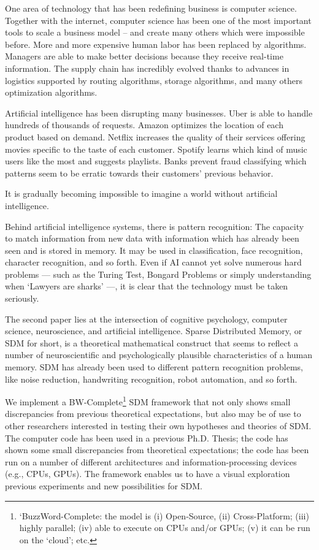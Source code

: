 One area of technology that has been redefining business is computer science. Together with the internet, computer science has been one of the most important tools to scale a business model -- and create many others which were impossible before. More and more expensive human labor has been replaced by algorithms. Managers are able to make better decisions because they receive real-time information. The supply chain has incredibly evolved thanks to advances in logistics supported by routing algorithms, storage algorithms, and many others optimization algorithms.

Artificial intelligence has been disrupting many businesses. Uber is able to handle hundreds of thousands of requests. Amazon optimizes the location of each product based on demand. Netflix increases the quality of their services offering movies specific to the taste of each customer. Spotify learns which kind of music users like the most and suggests playlists. Banks prevent fraud classifying which patterns seem to be erratic towards their customers' previous behavior.

It is gradually becoming impossible to imagine a world without artificial intelligence.

Behind artificial intelligence systems, there is pattern recognition: The capacity to match information from new data with information which has already been seen and is stored in memory. It may be used in classification, face recognition, character recognition, and so forth.  Even if AI cannot yet solve numerous hard problems --- such as the Turing Test, Bongard Problems or simply understanding when `Lawyers are sharks' \citep{french1990subcognition, french2000turing, linhares2000glimpse, french2001co} ---, it is clear that the technology must be taken seriously.

The second paper lies at the intersection of cognitive psychology, computer science, neuroscience, and artificial intelligence.  Sparse Distributed Memory, or SDM for short, is a theoretical mathematical construct that seems to reflect a number of neuroscientific and psychologically plausible characteristics of a human memory. SDM has already been used to different pattern recognition problems, like noise reduction, handwriting recognition, robot automation, and so forth.

We implement a BW-Complete\footnote{`BuzzWord-Complete: the model is (i) Open-Source, (ii) Cross-Platform; (iii) highly parallel; (iv) able to execute on CPUs and/or GPUs; (v) it can be run on the `cloud'; etc.} SDM framework that not only shows small discrepancies from previous theoretical expectations, but also may be of use to other researchers interested in testing their own hypotheses and theories of SDM. The computer code has been used in a previous Ph.D. Thesis; the code has shown some small discrepancies from theoretical expectations; the code has been run on a number of different architectures and information-processing devices (e.g., CPUs, GPUs).  The framework enables us to have a visual exploration previous experiments and new possibilities for SDM.

